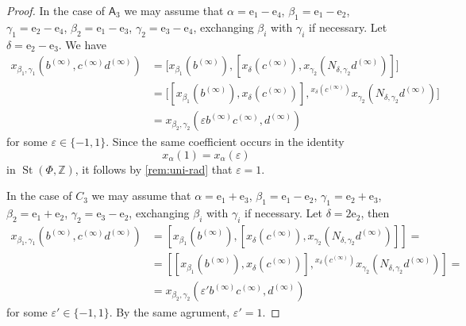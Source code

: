 \documentclass{article}
\numberwithin{equation}{section}
\theoremstyle{definition}
\theoremstyle{remark}
\DeclareMathOperator\St{St}
\newcommand{\up}[2]{{^{#1}\!{#2}}}
\newcommand{\rA}{\mathsf{A}}
\begin{document}
\begin{proof}
 In the case of \(\rA_3\) we may assume that \(\alpha = \mathrm e_1 - \mathrm e_4\), \(\beta_1 = \mathrm e_1 - \mathrm e_2\), \(\gamma_1 = \mathrm e_2 - \mathrm e_4\), \(\beta_2 = \mathrm e_1 - \mathrm e_3\), \(\gamma_2 = \mathrm e_3 - \mathrm e_4\), exchanging \(\beta_i\) with \(\gamma_i\) if necessary. Let \(\delta = \mathrm e_2 - \mathrm e_3\). We have
 \begin{align*}
 x_{\beta_1, \gamma_1}(b^{(\infty)}, c^{(\infty)} d^{(\infty)}) &= \bigl[x_{\beta_1}(b^{(\infty)}), [x_\delta(c^{(\infty)}), x_{\gamma_2}(N_{\delta, \gamma_2} d^{(\infty)})]\bigr]\\
 &= \bigl[[x_{\beta_1}(b^{(\infty)}), x_\delta(c^{(\infty)})], \up{x_\delta(c^{(\infty)})}{x_{\gamma_2}(N_{\delta, \gamma_2} d^{(\infty)})}\bigr]\\
 &= x_{\beta_2, \gamma_2}(\varepsilon b^{(\infty)} c^{(\infty)}, d^{(\infty)})
 \end{align*}
 for some \(\varepsilon \in \{-1, 1\}\). Since the same coefficient occurs in the identity
 \[x_\alpha(1) = x_\alpha(\varepsilon)\]
 in \(\St(\Phi, \mathbb Z)\), it follows by \cref{rem:uni-rad} that \(\varepsilon = 1\).

 In the case of \(C_3\) we may assume that \(\alpha = \mathrm e_1 + \mathrm e_3\), \(\beta_1 = \mathrm e_1 - \mathrm e_2\), \(\gamma_1 = \mathrm e_2 + \mathrm e_3\), \(\beta_2 = \mathrm e_1 + \mathrm e_2\), \(\gamma_2 = \mathrm e_3 - \mathrm e_2\), exchanging \(\beta_i\) with \(\gamma_i\) if necessary. Let \(\delta = 2 \mathrm e_2\), then
 \begin{align*}
 x_{\beta_1, \gamma_1}(b^{(\infty)}, c^{(\infty)} d^{(\infty)}) &= [x_{\beta_1}(b^{(\infty)}), [x_{\delta}(c^{(\infty)}), x_{\gamma_2}(N_{\delta, \gamma_2} d^{(\infty)})]] =\\
 &= [[x_{\beta_1}(b^{(\infty)}), x_\delta(c^{(\infty)})], \up{x_\delta(c^{(\infty)})}{x_{\gamma_2}(N_{\delta, \gamma_2} d^{(\infty)})}] =\\
 &= x_{\beta_2, \gamma_2}(\varepsilon' b^{(\infty)} c^{(\infty)}, d^{(\infty)})
 \end{align*}
 for some \(\varepsilon' \in \{-1, 1\}\). By the same agrument, \(\varepsilon' = 1\).


\end{proof}
\end{document}
